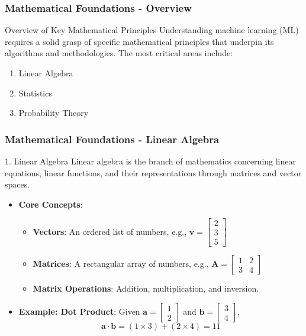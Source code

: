 \documentclass{beamer}
\begin{document}
\begin{frame}[fragile]
    \frametitle{Mathematical Foundations - Overview}
    \begin{block}{Overview of Key Mathematical Principles}
        Understanding machine learning (ML) requires a solid grasp of specific mathematical principles that underpin its algorithms and methodologies. The most critical areas include:
    \end{block}
    
    \begin{enumerate}
        \item Linear Algebra
        \item Statistics
        \item Probability Theory
    \end{enumerate}
\end{frame}

\begin{frame}[fragile]
    \frametitle{Mathematical Foundations - Linear Algebra}
    \begin{block}{1. Linear Algebra}
        Linear algebra is the branch of mathematics concerning linear equations, linear functions, and their representations through matrices and vector spaces.
    \end{block}
    
    \begin{itemize}
        \item \textbf{Core Concepts}:
        \begin{itemize}
            \item \textbf{Vectors}: An ordered list of numbers, e.g., \( \mathbf{v} = \begin{bmatrix} 2 \\ 3 \\ 5 \end{bmatrix} \)
            \item \textbf{Matrices}: A rectangular array of numbers, e.g., \( \mathbf{A} = \begin{bmatrix} 1 & 2 \\ 3 & 4 \end{bmatrix} \)
            \item \textbf{Matrix Operations}: Addition, multiplication, and inversion.
        \end{itemize}
        
        \item \textbf{Example: Dot Product}:
        Given \( \mathbf{a} = \begin{bmatrix} 1 \\ 2 \end{bmatrix} \) and \( \mathbf{b} = \begin{bmatrix} 3 \\ 4 \end{bmatrix} \),
        \[
        \mathbf{a} \cdot \mathbf{b} = (1 \times 3) + (2 \times 4) = 11
        \]
    \end{itemize}
\end{frame}
\end{document}
